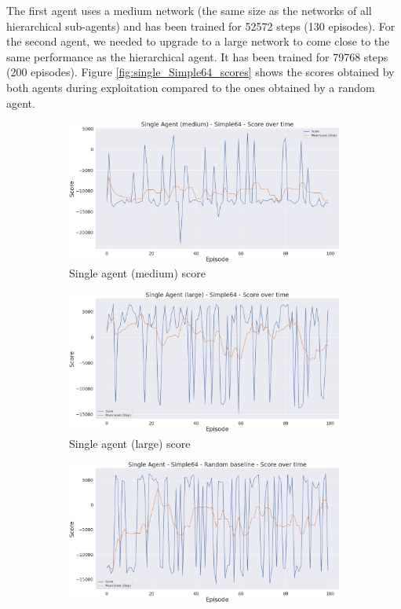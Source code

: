 The first agent uses a medium network (the same size as the networks of all hierarchical sub-agents) and has been trained for 52572 steps (130 episodes). For the second agent, we needed to upgrade to a large network to come close to the same performance as the hierarchical agent. It has been trained for 79768 steps (200 episodes). Figure \ref{fig:single_Simple64_scores} shows the scores obtained by both agents during exploitation compared to the ones obtained by a random agent.

\begin{figure}[t]
    \centering
    \begin{subfigure}[b]{0.495\textwidth}
        \includegraphics[width=1\textwidth]{figs/single_dqn_m_130/exploit/score.png}
        \caption{Single agent (medium) score}
    \end{subfigure}
    \begin{subfigure}[b]{0.495\textwidth}
        \includegraphics[width=1\textwidth]{figs/single_dqn_l_200/exploit/score.png}
        \caption{Single agent (large) score}
    \end{subfigure}
    \begin{subfigure}[b]{0.495\textwidth}
        \includegraphics[width=1\textwidth]{figs/single_random/exploit/score.png}

\end{subfigure}
\end{figure}
